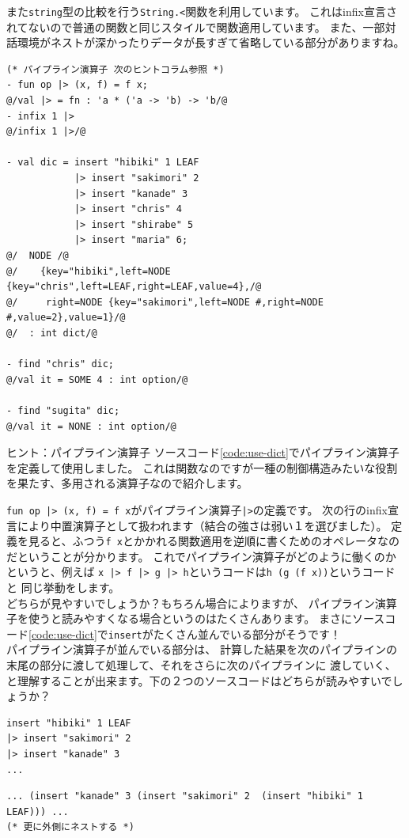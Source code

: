 \documentclass[11pt,a4paper]{article}
\begin{document}
また\lstinline{string}型の比較を行う\lstinline{String.<}関数を利用しています。
これはinfix宣言されてないので普通の関数と同じスタイルで関数適用しています。
また、一部対話環境がネストが深かったりデータが長すぎて省略している部分がありますね。

\begin{lstlisting}[caption=dict型の利用,label=code:use-dict]
(* パイプライン演算子 次のヒントコラム参照 *)
- fun op |> (x, f) = f x;
@/val |> = fn : 'a * ('a -> 'b) -> 'b/@
- infix 1 |>
@/infix 1 |>/@

- val dic = insert "hibiki" 1 LEAF
            |> insert "sakimori" 2
            |> insert "kanade" 3
            |> insert "chris" 4
            |> insert "shirabe" 5
            |> insert "maria" 6;
@/  NODE /@
@/    {key="hibiki",left=NODE {key="chris",left=LEAF,right=LEAF,value=4},/@
@/     right=NODE {key="sakimori",left=NODE #,right=NODE #,value=2},value=1}/@
@/  : int dict/@

- find "chris" dic;
@/val it = SOME 4 : int option/@

- find "sugita" dic;
@/val it = NONE : int option/@
\end{lstlisting}

\begin{itembox}[l]{ヒント：パイプライン演算子}
ソースコード\ref{code:use-dict}でパイプライン演算子を定義して使用しました。
これは関数なのですが一種の制御構造みたいな役割を果たす、多用される演算子なので紹介します。

\lstinline{fun op |> (x, f) = f x}がパイプライン演算子\lstinline{|>}の定義です。
次の行のinfix宣言により中置演算子として扱われます（結合の強さは弱い１を選びました）。
定義を見ると、ふつう\lstinline{f x}とかかれる関数適用を逆順に書くためのオペレータなのだということが分かります。
これでパイプライン演算子がどのように働くのかというと、例えば
\lstinline{x |> f |> g |> h}というコードは\lstinline{h (g (f x))}というコードと
同じ挙動をします。\\
どちらが見やすいでしょうか？もちろん場合によりますが、
パイプライン演算子を使うと読みやすくなる場合というのはたくさんあります。
まさにソースコード\ref{code:use-dict}で\lstinline{insert}がたくさん並んでいる部分がそうです！\\
パイプライン演算子が並んでいる部分は、
計算した結果を次のパイプラインの末尾の部分に渡して処理して、それをさらに次のパイプラインに
渡していく、と理解することが出来ます。下の２つのソースコードはどちらが読みやすいでしょうか？

\begin{lstlisting}
insert "hibiki" 1 LEAF
|> insert "sakimori" 2
|> insert "kanade" 3
...
\end{lstlisting}

\begin{lstlisting}
... (insert "kanade" 3 (insert "sakimori" 2  (insert "hibiki" 1 LEAF))) ...
(* 更に外側にネストする *)
\end{lstlisting}

\end{itembox}
\end{document}
